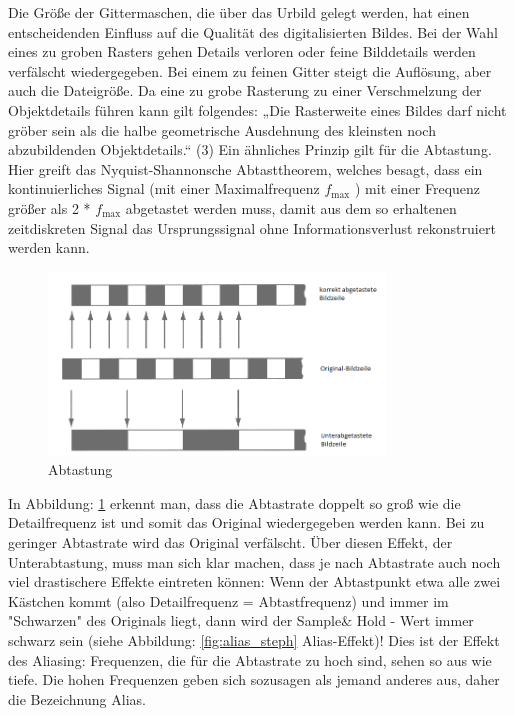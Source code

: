 Die Größe der Gittermaschen, die über das Urbild gelegt werden, hat einen entscheidenden Einfluss auf die Qualität des digitalisierten Bildes. Bei der Wahl eines zu groben Rasters gehen Details verloren oder feine Bilddetails werden verfälscht wiedergegeben. Bei einem zu feinen Gitter steigt die Auflösung, aber auch die Dateigröße. Da eine zu grobe Rasterung zu einer Verschmelzung der Objektdetails führen kann gilt folgendes:
„Die Rasterweite eines Bildes darf nicht gröber sein als die halbe geometrische Ausdehnung des kleinsten noch abzubildenden Objektdetails.“ (3)
Ein ähnliches Prinzip gilt für die Abtastung. Hier greift das Nyquist-Shannonsche Abtasttheorem, welches besagt, dass ein kontinuierliches Signal (mit einer Maximalfrequenz $ f_{\mathrm{max}} $ ) mit einer Frequenz größer als 2 * $ f_{\mathrm{max}} $ abgetastet werden muss, damit aus dem so erhaltenen zeitdiskreten Signal das Ursprungssignal ohne Informationsverlust rekonstruiert werden kann. 

\begin{figure}
	\centering
		\includegraphics[width=0.8\textwidth]{img/abtastung_steph.png}
	\caption[Abtastung]{Abtastung}
	\label{fig:abtastung_steph}
\end{figure}

In Abbildung: \ref{fig:abtastung_steph} erkennt man, dass die Abtastrate doppelt so groß wie die Detailfrequenz ist und somit das Original wiedergegeben werden kann. Bei zu geringer Abtastrate wird das Original verfälscht. Über diesen Effekt, der Unterabtastung, muss man sich klar machen, dass je nach Abtastrate auch noch viel drastischere Effekte eintreten können: Wenn der Abtastpunkt etwa alle zwei Kästchen kommt (also Detailfrequenz = Abtastfrequenz) und immer im "Schwarzen" des Originals liegt, dann wird der Sample\& Hold -
Wert immer schwarz sein (siehe Abbildung: \ref{fig:alias_steph} Alias-Effekt)! Dies ist der Effekt des Aliasing: Frequenzen, die für die Abtastrate zu hoch sind, sehen so aus wie tiefe. Die hohen Frequenzen geben sich sozusagen als jemand anderes aus, daher die Bezeichnung Alias. 

